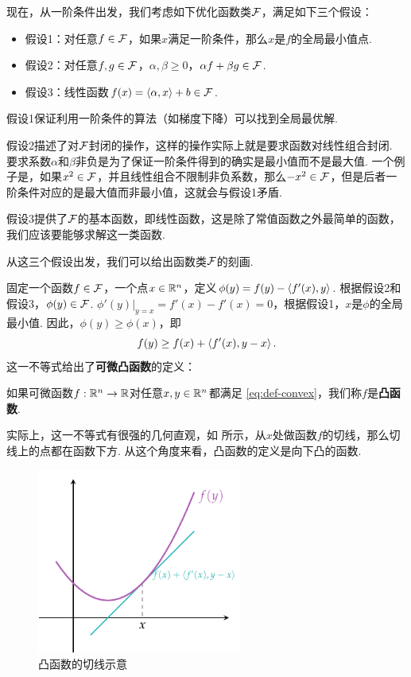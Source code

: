 现在，从一阶条件出发，我们考虑如下优化函数类$\mathcal F$，满足如下三个假设：
\begin{itemize}
    \item 假设1：对任意$f\in\mathcal F$，如果$x$满足一阶条件，那么$x$是$f$的全局最小值点.
    \item 假设2：对任意$f,g\in\mathcal F$，$\alpha,\beta\geq 0$，$\alpha f+\beta g\in\mathcal F$.
    \item 假设3：线性函数$f(x)=\left\langle{\alpha},{x}\right\rangle+b\in\mathcal F$.
\end{itemize}

假设1保证利用一阶条件的算法（如梯度下降）可以找到全局最优解. 

假设2描述了对$\mathcal F$封闭的操作，这样的操作实际上就是要求函数对线性组合封闭. 要求系数$\alpha$和$\beta$非负是为了保证一阶条件得到的确实是最小值而不是最大值. 一个例子是，如果$x^2\in\mathcal F$，并且线性组合不限制非负系数，那么$-x^2\in\mathcal F$，但是后者一阶条件对应的是最大值而非最小值，这就会与假设1矛盾.  

假设3提供了$\mathcal F$的基本函数，即线性函数，这是除了常值函数之外最简单的函数，我们应该要能够求解这一类函数.

从这三个假设出发，我们可以给出函数类$\mathcal F$的刻画. 

固定一个函数$f\in\mathcal F$，一个点$x\in\mathbb{R}^n$，定义$\phi(y)=f(y)-\left\langle{f'(x)},{y}\right\rangle$. 根据假设2和假设3，$\phi(y)\in\mathcal F$. $\phi'(y)|_{y=x}=f'(x)-f'(x)=0$，根据假设1，$x$是$\phi$的全局最小值. 因此，$\phi(y)\geq\phi(x)$，即
\begin{equation}
    f(y)\geq f(x)+\left\langle{f'(x)},{y-x}\right\rangle.\label{eq:def-convex}
\end{equation}
这一不等式给出了\textbf{可微凸函数}的定义：

\begin{definition}[可微凸函数]
    如果可微函数$f:\mathbb{R}^n\to\mathbb{R}$对任意$x,y\in\mathbb{R}^n$都满足 \eqref{eq:def-convex}，我们称$f$是\textbf{凸函数}. 
\end{definition}

实际上，这一不等式有很强的几何直观，如 所示，从$x$处做函数$f$的切线，那么切线上的点都在函数下方. 从这个角度来看，凸函数的定义是向下凸的函数.

\begin{figure}[ht]
    \centering
    \includegraphics[width=0.6\textwidth]{figures/convex-anlaysis/convex-tangent.pdf}
    \caption{凸函数的切线示意}
    \label{fig:convex-tangent}
\end{figure}

